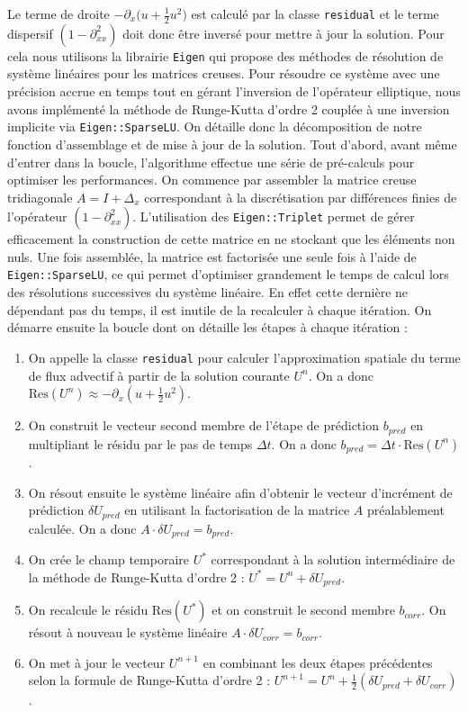 Le terme de droite $-\partial_x \big(u + \frac{1}{2}u^2\big)$ est calculé par la classe \texttt{residual} et le terme dispersif $(1 - \partial_{xx}^2)$ doit donc être inversé pour mettre à jour la solution. Pour cela nous utilisons la librairie \texttt{Eigen} qui propose des méthodes de résolution de système linéaires pour les matrices creuses. Pour résoudre ce système avec une précision accrue en temps tout en gérant l'inversion de l'opérateur elliptique, nous avons implémenté la méthode de Runge-Kutta d'ordre 2 couplée à une inversion implicite via \texttt{Eigen::SparseLU}. On détaille donc la décomposition de notre fonction d'assemblage et de mise à jour de la solution.
Tout d'abord, avant même d'entrer dans la boucle, l'algorithme effectue une série de pré-calculs pour optimiser les performances. On commence par assembler la matrice creuse tridiagonale $A = I + \Delta_x$ correspondant à la discrétisation par différences finies de l'opérateur $(1 - \partial_{xx}^2)$. L'utilisation des \texttt{Eigen::Triplet} permet de gérer efficacement la construction de cette matrice en ne stockant que les éléments non nuls. Une fois assemblée, la matrice est factorisée une seule fois à l'aide de \texttt{Eigen::SparseLU}, ce qui permet d'optimiser grandement le temps de calcul lors des résolutions successives du système linéaire. En effet cette dernière ne dépendant pas du temps, il est inutile de la recalculer à chaque itération.
On démarre ensuite la boucle dont on détaille les étapes à chaque itération :
\begin{enumerate}
    \item On appelle la classe \texttt{residual} pour calculer l'approximation spatiale du terme de flux advectif à partir de la solution courante $U^n$. On a donc $\text{Res}(U^n) \approx - \partial_x (u + \frac{1}{2}u^2)$.
    \item On construit le vecteur second membre de l'étape de prédiction $b_{pred}$ en multipliant le résidu par le pas de temps $\Delta t$. On a donc $b_{pred} = \Delta t \cdot \text{Res}(U^n)$.
    \item On résout ensuite le système linéaire afin d'obtenir le vecteur d'incrément de prédiction $\delta U_{pred}$ en utilisant la factorisation de la matrice $A$ préalablement calculée. On a donc $A \cdot \delta U_{pred} = b_{pred}$. 
    \item On crée le champ temporaire $U^*$ correspondant à la solution intermédiaire de la méthode de Runge-Kutta d'ordre 2 : $U^* = U^n + \delta U_{pred}$.
    \item On recalcule le résidu $\text{Res}(U^*)$ et on construit le second membre $b_{corr}$. On résout à nouveau le système linéaire $A \cdot \delta U_{corr} = b_{corr}$.
    \item On met à jour le vecteur $U^{n+1}$ en combinant les deux étapes précédentes selon la formule de Runge-Kutta d'ordre 2 : $U^{n+1} = U^n + \frac{1}{2}(\delta U_{pred} + \delta U_{corr})$.
\end{enumerate}

